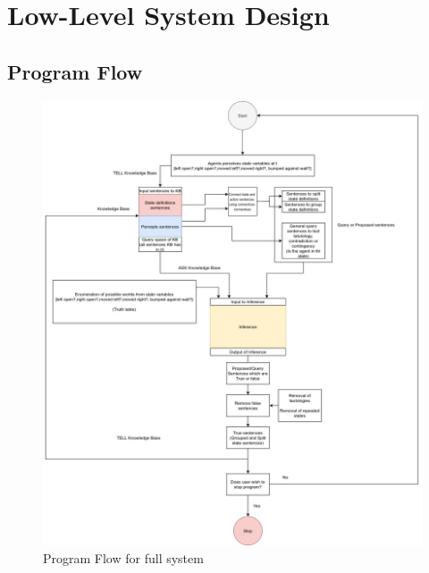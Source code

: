 






\chapter{Low-Level System Design} 
\label{Detailed_design}

\section{Program Flow}
\begin{figure}[H]
    \centering
    \includegraphics[scale=.3]{Figures/new_program_flow.jpg}
    \caption{Program Flow for full system} 
    \label{fig:program_flow}
\end{figure}

